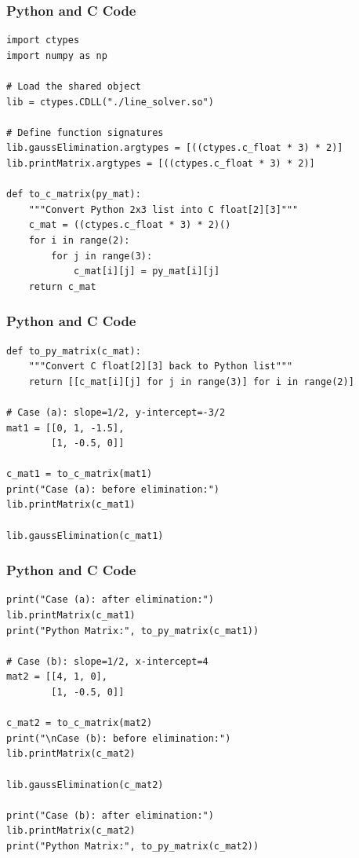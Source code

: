 \documentclass{beamer}
\begin{document}
\begin{frame}[fragile]
\frametitle{Python and C Code}

\begin{lstlisting}
import ctypes
import numpy as np

# Load the shared object
lib = ctypes.CDLL("./line_solver.so")

# Define function signatures
lib.gaussElimination.argtypes = [((ctypes.c_float * 3) * 2)]
lib.printMatrix.argtypes = [((ctypes.c_float * 3) * 2)]

def to_c_matrix(py_mat):
    """Convert Python 2x3 list into C float[2][3]"""
    c_mat = ((ctypes.c_float * 3) * 2)()
    for i in range(2):
        for j in range(3):
            c_mat[i][j] = py_mat[i][j]
    return c_mat
\end{lstlisting}

\end{frame}
\begin{frame}[fragile]
\frametitle{Python and C Code}

\begin{lstlisting}
def to_py_matrix(c_mat):
    """Convert C float[2][3] back to Python list"""
    return [[c_mat[i][j] for j in range(3)] for i in range(2)]

# Case (a): slope=1/2, y-intercept=-3/2
mat1 = [[0, 1, -1.5],
        [1, -0.5, 0]]

c_mat1 = to_c_matrix(mat1)
print("Case (a): before elimination:")
lib.printMatrix(c_mat1)

lib.gaussElimination(c_mat1)

\end{lstlisting}

\end{frame}
\begin{frame}[fragile]
\frametitle{Python and C Code}

\begin{lstlisting}
print("Case (a): after elimination:")
lib.printMatrix(c_mat1)
print("Python Matrix:", to_py_matrix(c_mat1))

# Case (b): slope=1/2, x-intercept=4
mat2 = [[4, 1, 0],
        [1, -0.5, 0]]

c_mat2 = to_c_matrix(mat2)
print("\nCase (b): before elimination:")
lib.printMatrix(c_mat2)

lib.gaussElimination(c_mat2)

print("Case (b): after elimination:")
lib.printMatrix(c_mat2)
print("Python Matrix:", to_py_matrix(c_mat2))


\end{lstlisting}

\end{frame}
 
\end{document}
